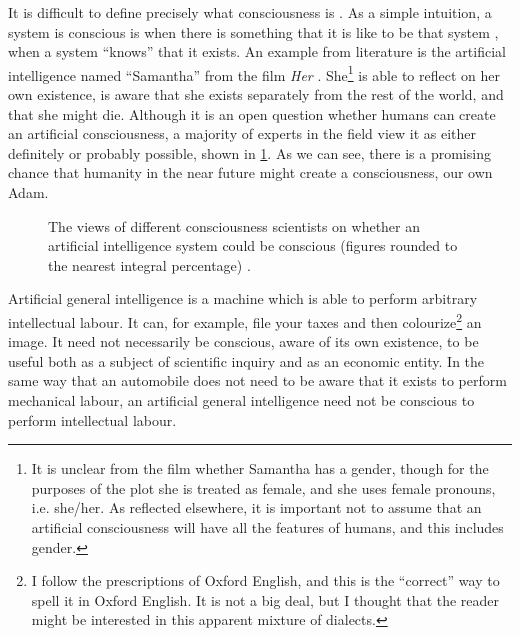 \documentclass[12pt]{report}
\begin{document}
It is difficult to define precisely what consciousness is \cite{Butlin2023-jm}.
As a simple intuition, a system is conscious is when there is something that it is like to be that system \cite{Nagel1974-dv}, when a system \enquote{knows} that it exists.
An example from literature is the artificial intelligence named \enquote{Samantha} from the film \textit{Her} \cite{Jonze2013-pk}.
She\footnote{It is unclear from the film whether Samantha has a gender, though for the purposes of the plot she is treated as female, and she uses female pronouns, i.e. she/her. As reflected elsewhere, it is important not to assume that an artificial consciousness will have all the features of humans, and this includes gender.} is able to reflect on her own existence, is aware that she exists separately from the rest of the world, and that she might die.
Although it is an open question whether humans can create an artificial consciousness, a majority of experts in the field view it as either definitely or probably possible, shown in \cref{fig:whether-an-ai-can-be-conscious}.
As we can see, there is a promising chance that humanity in the near future might create a consciousness, our own Adam.

\begin{figure}
    \centering
    \caption{The views of different consciousness scientists on whether an artificial intelligence system could be conscious (figures rounded to the nearest integral percentage) \cite{Francken2022-uk}.}
    \label{fig:whether-an-ai-can-be-conscious}
\end{figure}

Artificial general intelligence is a machine which is able to perform arbitrary intellectual labour.
It can, for example, file your taxes and then colourize\footnote{I follow the prescriptions of Oxford English, and this is the \enquote{correct} way to spell it in Oxford English. It is not a big deal, but I thought that the reader might be interested in this apparent mixture of dialects.} an image.
It need not necessarily be conscious, aware of its own existence, to be useful both as a subject of scientific inquiry and as an economic entity.
In the same way that an automobile does not need to be aware that it exists to perform mechanical labour, an artificial general intelligence need not be conscious to perform intellectual labour.
\end{document}
